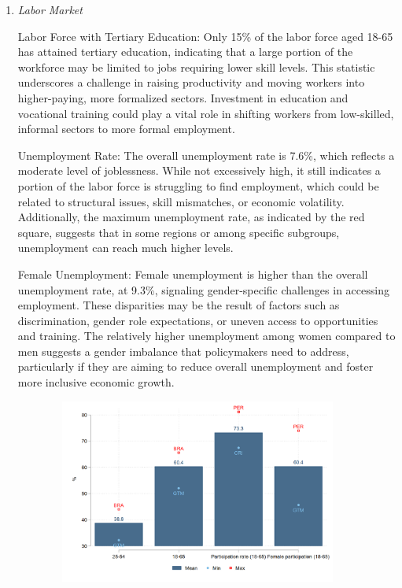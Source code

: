 \documentclass[english]{article}
\begin{document}
\begin{enumerate}
\begin{enumerate}
 \item\textit{Labor Market}

Labor Force with Tertiary Education:
Only 15\% of the labor force aged 18-65 has attained tertiary education, indicating that a large portion of the workforce may be limited to jobs requiring lower skill levels. This statistic underscores a challenge in raising productivity and moving workers into higher-paying, more formalized sectors. Investment in education and vocational training could play a vital role in shifting workers from low-skilled, informal sectors to more formal employment.

Unemployment Rate:
The overall unemployment rate is 7.6\%, which reflects a moderate level of joblessness. While not excessively high, it still indicates a portion of the labor force is struggling to find employment, which could be related to structural issues, skill mismatches, or economic volatility. Additionally, the maximum unemployment rate, as indicated by the red square, suggests that in some regions or among specific subgroups, unemployment can reach much higher levels.

Female Unemployment:
Female unemployment is higher than the overall unemployment rate, at 9.3\%, signaling gender-specific challenges in accessing employment. These disparities may be the result of factors such as discrimination, gender role expectations, or uneven access to opportunities and training. The relatively higher unemployment among women compared to men suggests a gender imbalance that policymakers need to address, particularly if they are aiming to reduce overall unemployment and foster more inclusive economic growth.

\end{enumerate}
    
\begin{figure}[h!tbp]
\justifying
  \caption{Demographic profile and structure of labor market}
\begin{subfigure}{.9\textwidth}
  \centering
  \includegraphics[width=1\linewidth]{latex/figures/Snapshot/Structure of labor market_a.png}
  \label{fig:labmarket1}
\end{subfigure}


\end{figure}
\end{enumerate}
\end{document}
